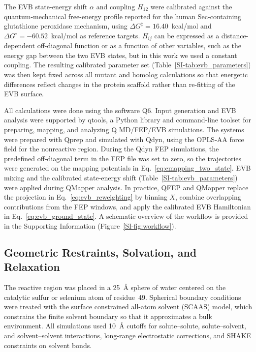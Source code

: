 The EVB state-energy shift $\alpha$ and coupling $H_{12}$ were calibrated against the quantum-mechanical free-energy profile reported for the human Sec-containing glutathione peroxidase mechanism,\cite{prabhakar_is_2006} using $\Delta G^{\ddagger}=16.40$~kcal/mol and $\Delta G^{\circ}=-60.52$~kcal/mol as reference targets. $H_{ij}$ can be expressed as a distance-dependent off-diagonal function or as a function of other variables, such as the energy gap between the two EVB states, but in this work we used a constant coupling. The resulting calibrated parameter set (Table~\ref{SI-tab:evb_parameters}) was then kept fixed across all mutant and homolog calculations so that energetic differences reflect changes in the protein scaffold rather than re-fitting of the EVB surface.

All calculations were done using the software Q6.\cite{marelius_q_1999} Input generation and EVB analysis were supported by qtools, a Python library and command-line toolset for preparing, mapping, and analyzing Q MD/FEP/EVB simulations.\cite{PurgBauer2017Qtools} The systems were prepared with Qprep and simulated with Qdyn, using the OPLS-AA force field for the nonreactive region.\cite{jorgensen1996opls_aa} During the Qdyn FEP simulations, the predefined off-diagonal term in the FEP file was set to zero, so the trajectories were generated on the mapping potentials in Eq.~\ref{eq:emapping_two_state}. EVB mixing and the calibrated state-energy shift (Table~\ref{SI-tab:evb_parameters}) were applied during QMapper analysis. In practice, QFEP and QMapper replace the projection in Eq.~\ref{eq:evb_reweighting} by binning $X$, combine overlapping contributions from the FEP windows, and apply the calibrated EVB Hamiltonian in Eq.~\ref{eq:evb_ground_state}.\cite{marelius_q_1999,oanca_efficient_2023,PurgBauer2017Qtools}
 A schematic overview of the workflow is provided in the Supporting Information (Figure~\ref{SI-fig:workflow}).

\subsection{Geometric Restraints, Solvation, and Relaxation}

The reactive region was placed in a 25~\AA{} sphere of water centered on the catalytic sulfur or selenium atom of residue~49. Spherical boundary conditions were treated with the surface constrained all-atom solvent (SCAAS) model, which constrains the finite solvent boundary so that it approximates a bulk environment.\cite{king_surface_1989} All simulations used 10~\AA{} cutoffs for solute--solute, solute--solvent, and solvent--solvent interactions, long-range electrostatic corrections, and SHAKE constraints on solvent bonds.

